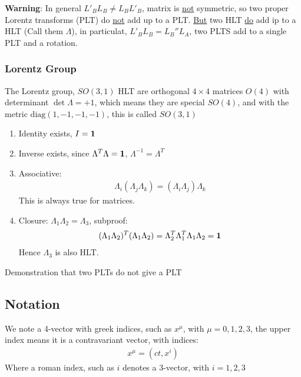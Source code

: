 \textbf{Warning}: In general $L'_BL_B\neq L_BL'_B$, matrix is \underline{not} symmetric, so two proper Lorentz transforms (PLT) do \underline{not} add up to a PLT. \underline{But} two HLT \underline{do} add ip to a HLT (Call them $\Lambda$), in particulat, $L'_BL_B=L_B''L_A$, two PLTS add to a single PLT and a rotation.

\subsubsection{Lorentz Group}
The Lorentz group, $SO(3,1)$ HLT are orthogonal $4\times4$ matrices $O(4)$ with determinant $\det\Lambda=+1$, which means they are special $SO(4)$, and with the metric $\mathrm{diag}(1,-1,-1,-1)$, this is called $SO(3,1)$
\begin{note}
  \begin{enumerate}
  \item Identity exists, $I=\bm{1}$
  \item Inverse exists, since $\Lambda^T\Lambda=\bm{1}$, $\Lambda^{-1}=\Lambda^T$
  \item Associative:
    \begin{align*}
      \Lambda_i(\Lambda_j\Lambda_k)=(\Lambda_i\Lambda_j)\Lambda_k
    \end{align*}
    This is always true for matrices.
  \item Closure: $\Lambda_1\Lambda_2=\Lambda_3$, subproof:
    \begin{align*}
      (\Lambda_1\Lambda_2)^T(\Lambda_1\Lambda_2)=
      \Lambda_2^T\Lambda_1^T\Lambda_1\Lambda_2=\bm{1}
    \end{align*}
    Hence $\Lambda_3$ is also HLT.
  \end{enumerate}
\end{note}
\begin{TODO}
  Demonstration that two PLTs do not give a PLT
\end{TODO}
\subsection{Notation}
We note a 4-vector with greek indices, such as $x^\mu$, with $\mu=0,1,2,3$, the upper index means it is a contravariant vector, with indices:
\begin{align*}
  x^\mu=(ct,x^i)
\end{align*}
Where a roman index, such as $i$ denotes a 3-vector, with $i=1,2,3$

